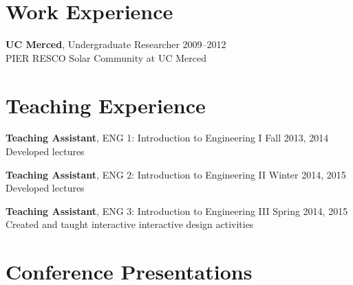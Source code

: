 \documentclass[]{res}
\begin{document}
\begin{resume}
\section{Work Experience}
\vspace{0.1in}
%

\textbf{UC Merced}, Undergraduate Researcher \hfill 2009--2012 \\
PIER RESCO Solar Community at UC Merced


\section{Teaching Experience}
\vspace{0.1in}

\textbf{Teaching Assistant}, ENG 1: Introduction to Engineering I \hfill Fall 2013, 2014 \\
Developed lectures

\textbf{Teaching Assistant}, ENG 2: Introduction to Engineering II \hfill Winter 2014, 2015 \\
Developed lectures

\textbf{Teaching Assistant}, ENG 3: Introduction to Engineering III \hfill Spring 2014, 2015 \\
Created and taught interactive interactive design activities


\section{Conference Presentations}
\vspace{0.1in}
%



\end{resume}
\end{document}
